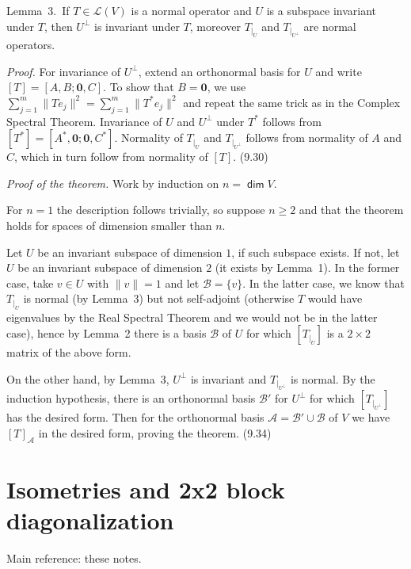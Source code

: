\documentclass[11pt]{article}
\newcommand{\1}{\mathbf{1}}
\newcommand{\0}{\mathbf{0}}
\newcommand{\A}{\mathcal{A}}
\newcommand{\B}{\mathcal{B}}
\DeclareMathOperator{\mydim}{\mathsf{dim}}
\renewcommand{\geq}{\geqslant}
\begin{document}
{\begin{itemize}
Lemma~3.\
If $T\in\mathcal{L}(V)$ is a normal operator and $U$ is a subspace invariant under $T$, then
$U^\perp$ is invariant under $T$, moreover $T_{|_U}$ and $T_{|_{U^\perp}}$ are normal operators.

\emph{Proof.}
For invariance of $ U^{\perp} $, extend an orthonormal basis for $U$ and write $ [T]=[A,B;\0,C] $.
To show that $ B=\0 $, we use $ \sum_{j=1}^m \|Te_j\|^2 = \sum_{j=1}^m \|T^*e_j\|^2 $ and repeat the same trick as in the Complex Spectral Theorem.
Invariance of $ U $ and $ U^\perp $ under $ T^* $ follows from $ [T^*] = [A^*, \0 ; \0, C^*] $.
Normality of $T_{|_U}$ and $T_{|_{U^\perp}}$ follows from normality of $ A $ and $C$, which in turn follow from normality of $ [T] $.
\hfill
(9.30)


\emph{Proof of the theorem.}
Work by induction on $n = \mydim V$.

For $n=1$ the description follows trivially, so suppose $n \geq 2$ and that the theorem holds for spaces of dimension smaller than $n$.

Let $U$ be an invariant subspace of dimension $1$, if such subspace exists.
If not, let $U$ be an invariant subspace of dimension $2$ (it exists by Lemma~1).
In the former case, take $v \in U$ with $\|v\|=1$ and let $\B = \{v\}$.
In the latter case, we know that $T_{|_U}$ is normal (by Lemma~3) but not self-adjoint (otherwise $T$ would have eigenvalues by the Real Spectral Theorem and we would not be in the latter case), hence by Lemma~2 there is a basis $\B$ of $U$ for which $[T_{|_U}]$ is a $2\times 2$ matrix of the above form.

On the other hand, by Lemma~3, $U^\perp$ is invariant and $T_{|_{U^\perp}}$ is normal.
By the induction hypothesis, there is an orthonormal basis $\B'$ for $U^\perp$ for which $[T_{|_{U^\perp}}]$ has the desired form.
Then for the orthonormal basis $\A = \B' \cup \B$ of $V$ we have $[T]_{\A}$ in the desired form, proving the theorem.
\hfill
(9.34)

\end{itemize}


\clearpage
\section{Isometries and 2x2 block diagonalization}

Main reference: these notes.

\begin{itemize}


\end{itemize}}
\end{document}
